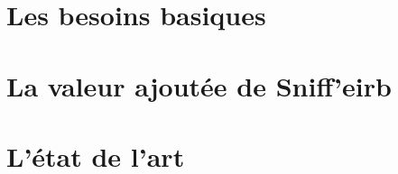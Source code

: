 \section{Les besoins basiques}%

\section{La valeur ajoutée de Sniff'eirb}%

\section{L'état de l'art}%
